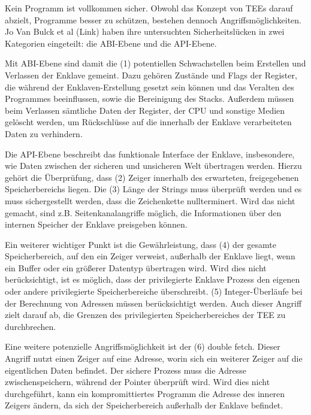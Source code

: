 Kein Programm ist vollkommen sicher. Obwohl das Konzept von TEEs darauf abzielt, Programme besser zu schützen, bestehen dennoch Angriffsmöglichkeiten. Jo Van Bulck et al (Link) haben ihre untersuchten Sicherheitslücken in zwei Kategorien eingeteilt: die ABI-Ebene und die API-Ebene.

Mit ABI-Ebene sind damit die (1) potentiellen Schwachstellen beim Erstellen und Verlassen der Enklave gemeint. Dazu gehören Zustände und Flags der Register, die während der Enklaven-Erstellung gesetzt sein können und das Veralten des Programmes beeinflussen, sowie die Bereinigung des Stacks. 
Außerdem müssen beim Verlassen sämtliche Daten der Register, der CPU und sonstige Medien gelöscht werden, um Rückschlüsse auf die innerhalb der Enklave verarbeiteten Daten zu verhindern.

Die API-Ebene beschreibt das funktionale Interface der Enklave, insbesondere, wie Daten zwischen der sicheren und unsicheren Welt übertragen werden. Hierzu gehört die Überprüfung, dass (2) Zeiger innerhalb des erwarteten, freigegebenen Speicherbereichs liegen. Die (3) Länge der Strings muss überprüft werden und es muss sichergestellt werden, dass die Zeichenkette nullterminert. Wird das nicht gemacht, sind z.B. Seitenkanalangriffe möglich, die Informationen über den internen Speicher der Enklave preisgeben können. 

Ein weiterer wichtiger Punkt ist die Gewährleistung, dass (4) der gesamte Speicherbereich, auf den ein Zeiger verweist, außerhalb der Enklave liegt, wenn ein Buffer oder ein größerer Datentyp übertragen wird. Wird dies nicht berücksichtigt, ist es möglich, dass der privilegierte Enklave Prozess den eigenen oder andere privilegierte Speicherbereiche überschreibt. (5) Integer-Überläufe bei der Berechnung von Adressen müssen berücksichtigt werden. Auch dieser Angriff zielt darauf ab, die Grenzen des privilegierten Speicherbereiches der TEE zu durchbrechen. 

Eine weitere potenzielle Angriffsmöglichkeit ist der (6) double fetch. Dieser Angriff nutzt einen Zeiger auf eine Adresse, worin sich ein weiterer Zeiger auf die eigentlichen Daten befindet. Der sichere Prozess muss die Adresse zwischenspeichern, während der Pointer überprüft wird. Wird dies nicht durchgeführt, kann ein kompromittiertes Programm die Adresse des inneren Zeigers ändern, da sich der Speicherbereich außerhalb der Enklave befindet.